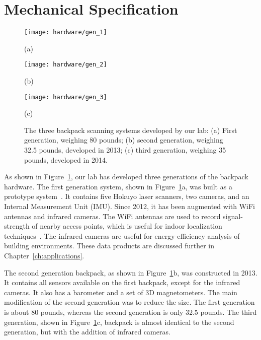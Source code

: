 \documentclass[12pt,onecolumn,oneside]{book}
\begin{document}
\section{Mechanical Specification}
\label{sec:mechanical}

\begin{figure}

	\centering
	\begin{minipage}[c]{0.32\linewidth}
		\centerline{\texttt{[image: hardware/gen\_1]}}
		\centerline{(a)}\medskip
	\end{minipage}
	\hfill
	\begin{minipage}[c]{0.32\linewidth}
		\centerline{\texttt{[image: hardware/gen\_2]}}
		\centerline{(b)}\medskip
	\end{minipage}
	\hfill
	\begin{minipage}[c]{0.32\linewidth}
		\centerline{\texttt{[image: hardware/gen\_3]}}
		\centerline{(c)}\medskip
	\end{minipage}	

	\caption[The three backpack scanning systems developed by our lab.]{The three backpack scanning systems developed by our lab:  (a) First generation, weighing 80 pounds; (b) second generation, weighing 32.5 pounds, developed in 2013; (c) third generation, weighing 35 pounds, developed in 2014.}
	\label{fig:all_backpacks}

\end{figure}

As shown in Figure~\ref{fig:all_backpacks}, our lab has developed three generations of the backpack hardware.  The first generation system, shown in Figure~\ref{fig:all_backpacks}a, was built as a prototype system~\cite{Backpack}.  It contains five Hokuyo laser scanners, two cameras, and an Internal Measurement Unit (IMU).  Since 2012, it has been augmented with WiFi antennas and infrared cameras.  The WiFi antennas are used to record signal-strength of nearby access points, which is useful for indoor localization techniques~\cite{Levchev14}.  The infrared cameras are useful for energy-efficiency analysis of building environments.  These data products are discussed further in Chapter~\ref{ch:applications}.

The second generation backpack, as shown in Figure~\ref{fig:all_backpacks}b, was constructed in 2013.  It contains all sensors available on the first backpack, except for the infrared cameras.  It also has a barometer and a set of 3D magnetometers.  The main modification of the second generation was to reduce the size.  The first generation is about 80 pounds, whereas the second generation is only 32.5 pounds.  The third generation, shown in Figure~\ref{fig:all_backpacks}c, backpack is almost identical to the second generation, but with the addition of infrared cameras.
\end{document}
